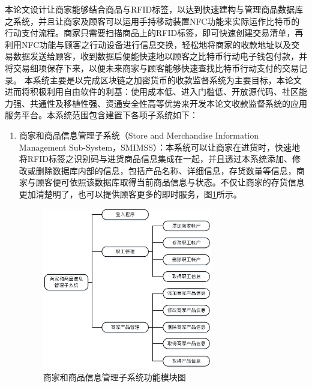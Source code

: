 	本论文设计让商家能够结合商品与RFID标签，以达到快速建构与管理商品数据库之系统，并且让商家及顾客可以运用手持移动装置NFC功能来实际运作比特币的行动支付流程。商家只需要扫描商品上的RFID标签，即可快速创建交易清单，再利用NFC功能与顾客之行动设备进行信息交换，轻松地将商家的收款地址以及交易数据发送给顾客，收到数据后便能快速地以顾客之比特币行动电子钱包付款，并将交易细项保存下来，以便未来商家与顾客能够快速查找比特币行动支付的交易记录。
	本系统主要是以完成区块链之加密货币的收款监督系统为主要目标，本论文进而将积极利用自由软件的利基：使用成本低、进入门槛低、开放源代码、社区能力强、共通性及移植性强、资通安全性高等优势来开发本论文收款监督系统的应用服务平台。本系统范围包含建置下各项子系统如下：
		\begin{enumerate}
		\item 商家和商品信息管理子系统（Store and Merchandise Information Management Sub-System，SMIMSS）：本系统可以让商家在进货时，快速地将RFID标签之识别码与进货商品信息集成在一起，并且透过本系统添加、修改或删除数据库内部的信息，包括产品名称、详细信息，存货数量等信息，商家与顾客便可依照该数据库取得当前商品信息与状态。不仅让商家的存货信息更加清楚明了，也可以提供顾客更多的即时服务，图\ref{model1}所示。

			\begin{figure}[!htbp]
			\centering
			\includegraphics[width = 0.7\textwidth]{model1.jpg}
			\caption{商家和商品信息管理子系统功能模块图}\label{model1}
			\end{figure}




\end{enumerate}

